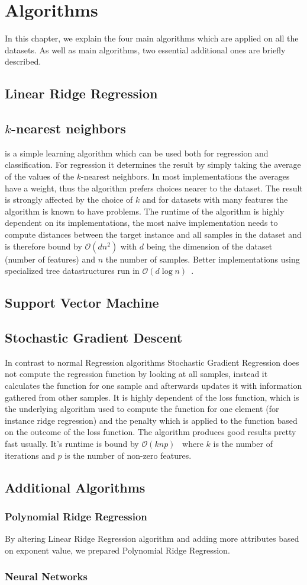 \section{Algorithms}
In this chapter, we explain the four main algorithms which are applied on all the datasets. As well as main algorithms, two essential additional ones are briefly described.

\subsection{Linear Ridge Regression}
\subsection{$k$-nearest neighbors}
is a simple learning algorithm which can be used both for regression and classification. For regression it determines the result by simply taking the average of the values of the $k$-nearest neighbors. In most implementations the averages have a weight, thus the algorithm prefers choices nearer to the dataset. The result is strongly affected by the choice of $k$ and for datasets with many features the algorithm is known to have problems. The runtime of the algorithm is highly dependent on its implementations, the most naive implementation needs to compute distances between the target instance and all samples in the dataset and is therefore bound by $\mathcal{O}(dn^2)$ with $d$ being the dimension of the dataset (number of features) and $n$ the number of samples. Better implementations using specialized tree datastructures run in $\mathcal{O}(d\log n)$~\cite{alg:knn}.
\subsection{Support Vector Machine}
\subsection{Stochastic Gradient Descent}
In contrast to normal Regression algorithms Stochastic Gradient Regression does not compute the regression function by looking at all samples, instead it calculates the function for one sample and afterwards updates it with information gathered from other samples. It is highly dependent of the loss function, which is the underlying algorithm used to compute the function for one element (for instance ridge regression) and the penalty which is applied to the function based on the outcome of the loss function. The algorithm produces good results pretty fast usually. It's runtime is bound by $\mathcal{O}(knp)$~\cite{alg:sgd} where $k$ is the number of iterations and $p$ is the number of non-zero features. 
\subsection{Additional Algorithms}
\subsubsection{Polynomial Ridge Regression}
By altering Linear Ridge Regression algorithm and adding more attributes based on exponent value, we prepared Polynomial Ridge Regression.
\subsubsection{Neural Networks}


